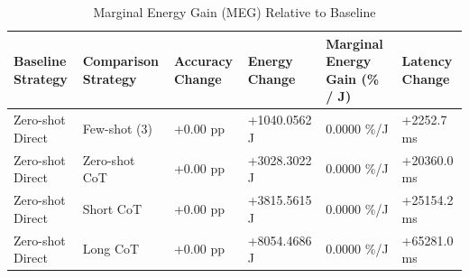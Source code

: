 \begin{table}
\caption{Marginal Energy Gain (MEG) Relative to Baseline}
\label{tab:marginal_energy_gain}
\begin{tabular}{llllll}
\toprule
Baseline Strategy & Comparison Strategy & Accuracy Change & Energy Change & Marginal Energy Gain (\% / J) & Latency Change \\
\midrule
Zero-shot Direct & Few-shot (3) & +0.00 pp & +1040.0562 J & 0.0000 \%/J & +2252.7 ms \\
Zero-shot Direct & Zero-shot CoT & +0.00 pp & +3028.3022 J & 0.0000 \%/J & +20360.0 ms \\
Zero-shot Direct & Short CoT & +0.00 pp & +3815.5615 J & 0.0000 \%/J & +25154.2 ms \\
Zero-shot Direct & Long CoT & +0.00 pp & +8054.4686 J & 0.0000 \%/J & +65281.0 ms \\
\bottomrule
\end{tabular}
\end{table}
